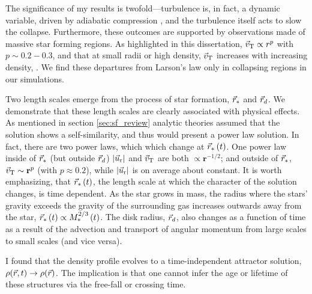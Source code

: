 \documentclass[../dissertation.tex]{subfiles}
\begin{document}
The significance of my results is twofold---turbulence is, in fact, a dynamic variable, driven by adiabatic compression \citep{2012ApJ...750L..31R}, 
and the turbulence itself acts to slow the collapse. 
Furthermore, these outcomes are supported by observations made of massive star forming regions. 
As highlighted in this dissertation,  $\vec{v}_{\rm T} \propto r^p$ with $ p \sim 0.2-0.3$, and that at small radii or high density, $\vec{v}_{\rm T}$  
increases with increasing density, \citep{1997ApJ...476..730P}. 
We find these departures from Larson's law only in collapsing regions in our simulations. 

Two length scales emerge from the process of star formation, $\vec{r}_*$ and $\vec{r}_d$. 
We demonstrate that these length scales are clearly associated with physical effects. 
As mentioned in section \ref{sec:sf_review} analytic theories assumed that the solution shows a self-similarity, and thus would present a power law solution.
In fact, there are two power laws, which which change at $\vec{r}_*\left( t \right)$. 
One power law inside of $\vec{r}_*$ (but outside $\vec{r}_d$) $|\vec{u}_{ \rm r}|$ and  $\vec{v}_{\rm T}$ are both
$\propto \mathbf{r}^{-1/2}$; and outside of $\vec{r}_*$, $\vec{v}_{\rm T} \sim \mathbf{r}^{p}$ (with $p\approx0.2$), while $|\vec{u}_{ \rm r}|$ is on average about constant. 
It is worth emphasizing, that $\vec{r}_* \left( t \right)$, the length scale at which the character of the solution changes, is time dependent. 
As the star grows in mass, the radius where the stars' gravity exceeds the gravity of the surrounding gas increases outwards away from the star, 
$\vec{r}_*\left( t \right) \propto M_*^{2/3}\left( t \right)$.
The disk radius, $\vec{r}_d$, also changes as a function of time as a result of the advection and 
transport of angular momentum from large scales to small scales (and vice versa).

I found that the density profile evolves to a time-independent attractor solution, $\rho(\vec{r},t) \rightarrow \rho(\vec{r})$. 
The implication is that one cannot infer the age or lifetime of these structures via the free-fall or crossing time.
\end{document}
